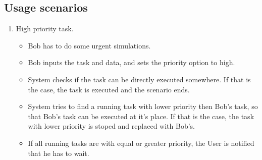 \subsection{Usage scenarios}
\begin{enumerate}
	\item High priority task.
	\begin{itemize}
		\item Bob has to do some urgent simulations.
		\item Bob inputs the task and data, and sets the priority option to high.
		\item System checks if the task can be directly executed somewhere.
		If that is the case, the task is executed and the scenario ends.
		\item System tries to find a running task with lower priority then Bob's task, so that Bob's task can be executed at it's place.
		If that is the case, the task with lower priority is stoped and replaced with Bob's.
		\item If all running tasks are with equal or greater priority, the User is notified that he has to wait.
	\end{itemize}
\end{enumerate}